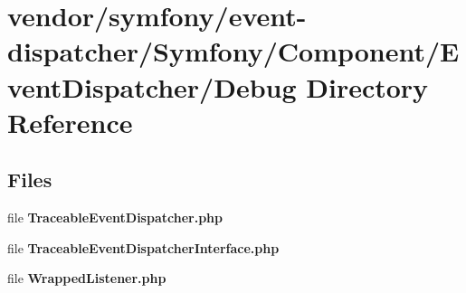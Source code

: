 \section{vendor/symfony/event-\/dispatcher/\+Symfony/\+Component/\+Event\+Dispatcher/\+Debug Directory Reference}
\label{dir_ed12e242551cb3247ab03c6933793694}
\subsection*{Files}
\begin{DoxyCompactItemize}
\item 
file {\bf Traceable\+Event\+Dispatcher.\+php}
\item 
file {\bf Traceable\+Event\+Dispatcher\+Interface.\+php}
\item 
file {\bf Wrapped\+Listener.\+php}
\end{DoxyCompactItemize}

